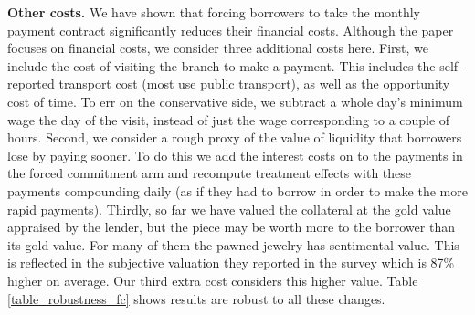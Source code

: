 \documentclass[11pt, a4paper]{article}
\begin{document}
\noindent \textbf{Other costs.} We have shown that forcing borrowers to take the monthly payment contract significantly reduces their financial costs. Although the paper focuses on financial costs, we consider three additional costs here. First, we include the cost of visiting the branch to make a payment. This includes the self-reported transport cost (most use public transport), as well as the opportunity cost of time. To err on the conservative side, we subtract a whole day's minimum wage the day of the visit, instead of just the wage corresponding to a couple of hours. Second, we consider a rough proxy of the value of liquidity that borrowers lose by paying sooner. To do this we add the interest costs on to the payments in the forced commitment arm and recompute treatment effects with these payments compounding daily (as if they had to borrow in order to make the more rapid payments). Thirdly, so far we have valued the collateral at the gold value appraised by the lender, but the piece may be worth more to the borrower than its gold value.  For many of them the pawned jewelry has sentimental value. This is reflected in the subjective valuation they reported in the survey which is 87\% higher on average. Our third extra cost considers this higher value. Table \ref{table_robustness_fc} shows results are robust to all these changes. 
\end{document}
